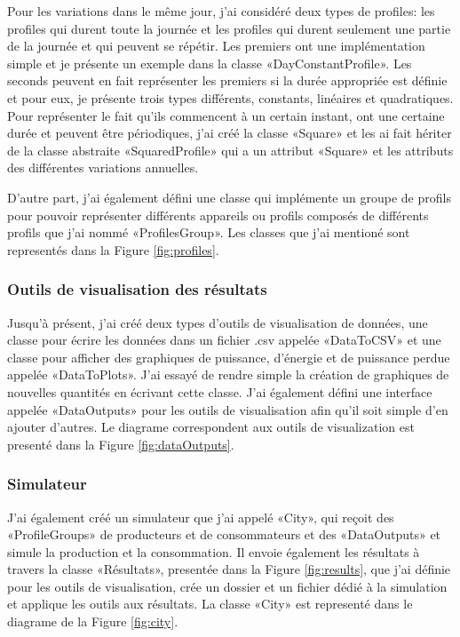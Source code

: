 \documentclass[11pt,a4paper,openany]{article}
\begin{document}
Pour les variations dans le même jour, j'ai considéré deux types de profiles: les profiles qui durent toute la journée et les profiles qui durent seulement une partie de la journée et qui peuvent se répétir. Les premiers ont une implémentation simple et je présente un exemple dans la classe «DayConstantProfile». Les seconds peuvent en fait représenter les premiers si la durée appropriée est définie et pour eux, je présente trois types différents, constants, linéaires et quadratiques. Pour représenter le fait qu'ils commencent à un certain instant, ont une certaine durée et peuvent être périodiques, j'ai créé la classe «Square» et les ai fait hériter de la classe abstraite «SquaredProfile» qui a un attribut «Square» et les attributs des différentes variations annuelles.

D'autre part, j'ai également défini une classe qui implémente un groupe de profils pour pouvoir représenter différents appareils ou profils composés de différents profils que j'ai nommé «ProfilesGroup». Les classes que j'ai mentioné sont representés dans la Figure \ref{fig:profiles}.

\subsubsection*{Outils de visualisation des résultats}

Jusqu'à présent, j'ai créé deux types d'outils de visualisation de données, une classe pour écrire les données dans un fichier .csv appelée «DataToCSV» et une classe pour afficher des graphiques de puissance, d'énergie et de puissance perdue appelée «DataToPlots». J'ai essayé de rendre simple la création de graphiques de nouvelles quantités en écrivant cette classe. J'ai également défini une interface appelée «DataOutputs» pour les outils de visualisation afin qu'il soit simple d'en ajouter d'autres. Le diagrame correspondent aux outils de visualization est presenté dans la Figure \ref{fig:dataOutputs}.

\subsubsection*{Simulateur}

J'ai également créé un simulateur que j'ai appelé «City», qui reçoit des «ProfileGroups» de producteurs et de consommateurs et des «DataOutputs» et simule la production et la consommation. Il envoie également les résultats à travers la classe «Résultats», presentée dans la Figure \ref{fig:results},  que j'ai définie pour les outils de visualisation, crée un dossier et un fichier dédié à la simulation et applique les outils aux résultats. La classe «City» est representé dans le diagrame de la Figure \ref{fig:city}.
\end{document}
